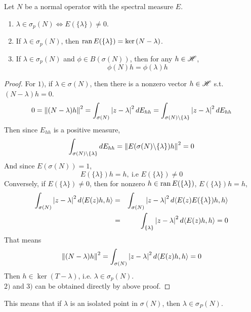 \documentclass[a4paper,11pt]{report}
\begin{document}
\begin{prop} \label{prop11}
	Let $N$ be a normal operator with the spectral measure $E$.
	\begin{enumerate}[label=\arabic*)]
		\item $\lambda \in \sigma_p(N) \Leftrightarrow E(\{\lambda\}) \neq 0$.
		\item If $\lambda \in \sigma_p(N)$, then $\operatorname{ran}{E(\{\lambda\})}=\ker{(N-\lambda)}$.
		\item If $\lambda \in \sigma_p(N)$ and $\phi \in B(\sigma(N))$, then for any $h \in \mathscr{H}$,
		\begin{equation*}
			\phi(N)h = \phi(\lambda)h
		\end{equation*}
	\end{enumerate}
\end{prop}
\begin{proof}
	For $1)$, if $\lambda \in \sigma(N)$, then there is a nonzero vector $h \in \mathscr{H}$ s.t. $(N-\lambda)h=0$.
	\begin{equation*}
		0 = \left\lVert(N-\lambda)h\right\lVert^2=\int_{\sigma(N)} \left\lvert z-\lambda\right\lvert^2 d E_{hh} = \int_{\sigma(N) \backslash \{\lambda\}} \left\lvert z-\lambda\right\lvert^2 d E_{hh}
	\end{equation*}
	Then since $E_{hh}$ is a positive measure,
	\begin{equation*}
		\int_{\sigma(N) \backslash \{\lambda\}} d E_{hh} = \left\lVert E(\sigma(N) \backslash \{\lambda\})h\right\lVert^2 = 0
	\end{equation*} 
	And since $E(\sigma(N))=1$, 
	\begin{equation*}
		E(\{\lambda\})h = h,~\text{i.e } E(\{\lambda\}) \neq 0
	\end{equation*}
	Conversely, if $E(\{\lambda\}) \neq 0$, then for nonzero $h \in \operatorname{ran}{E(\{\lambda\})}$, $E(\{\lambda\})h = h$,
	\begin{eqnarray*}
		\int_{\sigma(N)} \left\lvert z-\lambda\right\lvert^2 d \langle E(z)h,h \rangle &=&  \int_{\sigma(N)} \left\lvert z-\lambda\right\lvert^2 d \langle E(z)E(\{\lambda\})h,h \rangle \\
		&=& \int_{\{\lambda\}} \left\lvert z-\lambda\right\lvert^2 d \langle E(z)h,h \rangle =0
	\end{eqnarray*}
	That means
	\begin{equation*}
		\left\lVert(N-\lambda)h\right\lVert^2 = \int_{\sigma(N)} \left\lvert z-\lambda\right\lvert^2 d \langle E(z)h,h \rangle = 0
	\end{equation*}
	Then $h \in \ker{(T-\lambda)}$, i.e. $\lambda \in \sigma_p(N)$. \\
	$2)$ and $3)$ can be obtained directly by above proof.
\end{proof}
\begin{rem}
	This means that if $\lambda$ is an isolated point in $\sigma(N)$, then $\lambda \in \sigma_P(N)$.
\end{rem}
\end{document}
